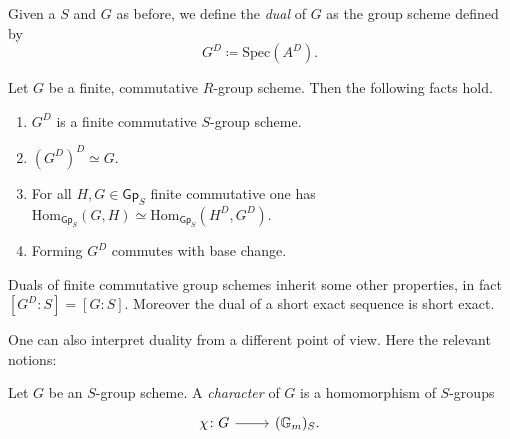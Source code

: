 \documentclass[../Main]{subfiles}
\begin{document}
\begin{defn}
	Given a $S$ and $G$ as before, we define the {\em dual} of $G$ as the
	group scheme defined by
	\begin{equation*}
	G^D \coloneqq \mathrm{Spec}(A^D)
	.\end{equation*}
\end{defn}


\begin{thm}\label{thm:CartierDuality}
	Let $G$ be a finite, commutative $R$-group scheme.
	Then the following facts hold.
\begin{enumerate}
	\item $G^D$ is a finite commutative $S$-group scheme.
	\item $( G^D )^D \simeq G$.
	\item For all $H,G \in \mathsf{Gp}_S$ finite commutative one has
	$\mathrm{Hom}_{\mathsf{Gp}_S} \left( G, H \right) \simeq
	\mathrm{Hom}_{\mathsf{Gp}_S} \left( H^D, G^D \right)$.
	\item Forming $G^D$ commutes with base change.
\end{enumerate}
\end{thm}

\begin{rem}[]
	Duals of finite commutative group schemes inherit some other properties,
	in fact $[G^D : S] = [G : S]$.
	Moreover the dual of a short exact sequence is short exact.
\end{rem}

One can also interpret duality from a different point of view.
Here the relevant notions:
\begin{defn}
	Let $G$ be an $S$-group scheme.
	A {\em character} of $G$ is a homomorphism of $S$-groups
	\begin{equation*}
	\begin{tikzcd}[row sep = 0ex
		,/tikz/column 1/.append style={anchor=base east}
		,/tikz/column 2/.append style={anchor=base west}]
		\chi\colon G \arrow[r, "", rightarrow] &
		(\mathbb{G}_m)_S
	.\end{tikzcd}
	\end{equation*} 
\end{defn}
\end{document}
